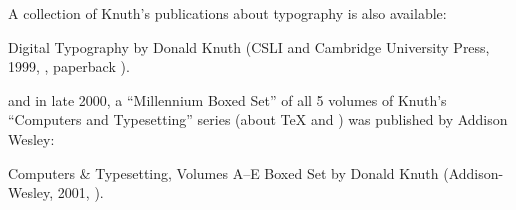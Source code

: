 A collection of Knuth's publications about typography is also available:
\begin{booklist}
\item[Digital Typography]by Donald Knuth (CSLI and Cambridge
  University Press, 1999, , paperback
  ).
\end{booklist}
\nothtml{\noindent}and in late 2000, a ``Millennium Boxed Set'' of all
5 volumes of Knuth's ``Computers and Typesetting'' series (about
\TeX{} and \MF{}) was published by Addison Wesley:
\begin{booklist}
\item[Computers \& Typesetting, Volumes A--E Boxed Set]by Donald Knuth
  (Addison-Wesley, 2001, ).
\end{booklist}


